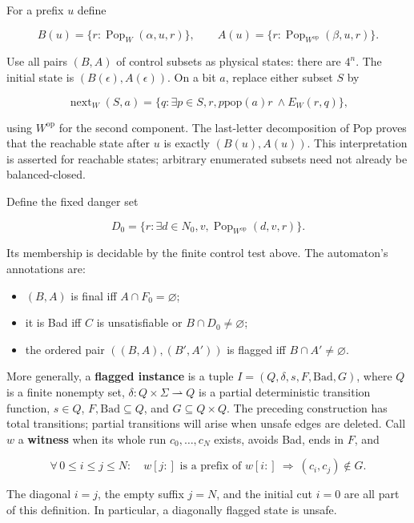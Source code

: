 \documentclass[
  11pt,
  a4paper,
]{article}
\newcounter{none} %
\providecommand{\tightlist}{%
  \setlength{\itemsep}{0pt}\setlength{\parskip}{0pt}}
\begin{document}
For a prefix \(u\) define

\[B(u)=\{r:\operatorname{Pop}_W(\alpha,u,r)\},\qquad
A(u)=\{r:\operatorname{Pop}_{W^{\mathrm{op}}}(\beta,u,r)\}.\]

Use all pairs \((B,A)\) of control subsets as physical states: there are
\(4^n\). The initial state is \((B(\epsilon),A(\epsilon))\). On a bit
\(a\), replace either subset \(S\) by

\[\operatorname{next}_W(S,a)
=\{q:\exists p\in S,r, p\mathrel{\mathrm{pop}(a)}r\ \land E_W(r,q)\},\tag{3.3}\]

using \(W^{\mathrm{op}}\) for the second component. The last-letter
decomposition of Pop proves that the reachable state after \(u\) is
exactly \((B(u),A(u))\). This interpretation is asserted for reachable
states; arbitrary enumerated subsets need not already be
balanced-closed.

Define the fixed danger set

\[D_0=\{r:\exists d\in N_0,v,
\operatorname{Pop}_{W^{\mathrm{op}}}(d,v,r)\}.\]

Its membership is decidable by the finite control test above. The
automaton's annotations are:

\begin{itemize}
\tightlist
\item
  \((B,A)\) is final iff \(A\cap F_0=\varnothing\);
\item
  it is Bad iff \(C\) is unsatisfiable or \(B\cap D_0\ne\varnothing\);
\item
  the ordered pair \(((B,A),(B',A'))\) is flagged iff
  \(B\cap A'\ne\varnothing\).
\end{itemize}

More generally, a \textbf{flagged instance} is a tuple
\(I=(Q,\delta,s,F,\mathrm{Bad},G)\), where \(Q\) is a finite nonempty
set, \(\delta:Q\times\Sigma\rightharpoonup Q\) is a partial
deterministic transition function, \(s\in Q\),
\(F,\mathrm{Bad}\subseteq Q\), and \(G\subseteq Q\times Q\). The
preceding construction has total transitions; partial transitions will
arise when unsafe edges are deleted. Call \(w\) a \textbf{witness} when
its whole run \(c_0,\ldots,c_N\) exists, avoids Bad, ends in \(F\), and

\[\forall\,0\le i\le j\le N:\quad
w[j:]\text{ is a prefix of }w[i:]
\ \Longrightarrow\ (c_i,c_j)\notin G.\tag{3.4}\]

The diagonal \(i=j\), the empty suffix \(j=N\), and the initial cut
\(i=0\) are all part of this definition. In particular, a diagonally
flagged state is unsafe.
\end{document}

